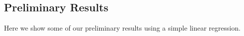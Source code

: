 


	\subsection{Preliminary Results}
	Here we show some of our preliminary results using a simple linear regression.
	
